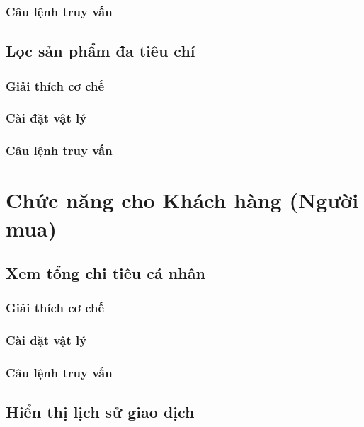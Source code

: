 \subsubsection{Câu lệnh truy vấn}

\subsection{Lọc sản phẩm đa tiêu chí}

\subsubsection{Giải thích cơ chế}

\subsubsection{Cài đặt vật lý}

\subsubsection{Câu lệnh truy vấn}

\section{Chức năng cho Khách hàng (Người mua)}

\subsection{Xem tổng chi tiêu cá nhân}

\subsubsection{Giải thích cơ chế}

\subsubsection{Cài đặt vật lý}

\subsubsection{Câu lệnh truy vấn}

\subsection{Hiển thị lịch sử giao dịch}

